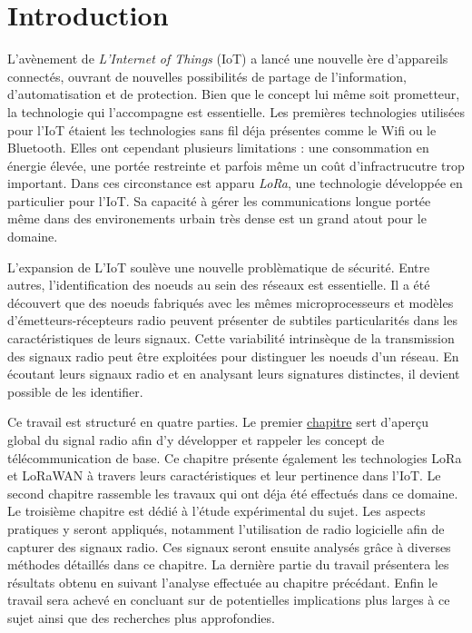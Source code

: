 

\chapter*{Introduction}

\renewcommand{\leftmark}{INTRODUCTION}

L'avènement de \textit{L'Internet of Things} (IoT) a lancé une nouvelle ère d'appareils connectés, ouvrant de nouvelles possibilités de partage de l'information, d'automatisation et de protection. Bien que le concept lui même soit prometteur, la technologie qui l'accompagne est essentielle.
Les premières technologies utilisées pour l'IoT étaient les technologies sans fil déja présentes comme le Wifi ou le Bluetooth. Elles ont cependant plusieurs limitations : une consommation en énergie élevée, une portée restreinte et parfois même un coût d'infractrucutre trop important.
Dans ces circonstance est apparu \textit{LoRa}, une technologie développée en particulier pour l'IoT. Sa capacité à gérer les communications longue portée même dans des environements urbain très dense est un grand atout pour le domaine.

\vspace{0.1cm}

L'expansion de L'IoT soulève une nouvelle problèmatique de sécurité. Entre autres, l'identification des noeuds au sein des réseaux est essentielle. Il a été découvert que des noeuds fabriqués avec les mêmes microprocesseurs et modèles d'émetteurs-récepteurs radio peuvent présenter de subtiles particularités dans les caractéristiques de leurs signaux. Cette variabilité intrinsèque de la transmission des signaux radio peut être exploitées pour distinguer les noeuds d’un réseau. En écoutant leurs signaux radio et en analysant leurs signatures distinctes, il devient possible de les identifier.

\vspace{0.1cm}

Ce travail est structuré en quatre parties. Le premier          \hyperref[chap1]{chapitre} sert d'aperçu global du signal radio afin d'y développer et rappeler les concept de \\télécommunication de base. Ce chapitre présente également les technologies LoRa et LoRaWAN à travers leurs caractéristiques et leur pertinence dans l'IoT.
Le second chapitre rassemble les travaux qui ont déja été effectués dans ce domaine.
Le troisième chapitre est dédié à l'étude expérimental du sujet. Les aspects pratiques y seront appliqués, notamment l'utilisation de radio logicielle afin de capturer des signaux radio. Ces signaux seront ensuite analysés grâce à diverses méthodes détaillés dans ce chapitre.
La dernière partie du travail présentera les résultats obtenu en suivant l'analyse effectuée au chapitre précédant. Enfin le travail sera achevé en concluant sur de potentielles implications plus larges à ce sujet ainsi que des recherches plus approfondies.